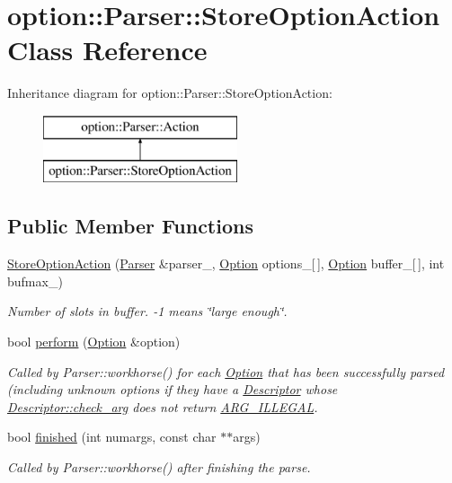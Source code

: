 \hypertarget{classoption_1_1Parser_1_1StoreOptionAction}{}\section{option\+:\+:Parser\+:\+:Store\+Option\+Action Class Reference}
\label{classoption_1_1Parser_1_1StoreOptionAction}
Inheritance diagram for option\+:\+:Parser\+:\+:Store\+Option\+Action\+:\begin{figure}[H]
\begin{center}
\leavevmode
\includegraphics[height=2.000000cm]{classoption_1_1Parser_1_1StoreOptionAction}
\end{center}
\end{figure}
\subsection*{Public Member Functions}
\begin{DoxyCompactItemize}
\item 
\hyperlink{classoption_1_1Parser_1_1StoreOptionAction_aaa638cdd712202e3e10471d4299f7f9d}{Store\+Option\+Action} (\hyperlink{classoption_1_1Parser}{Parser} \&parser\+\_\+, \hyperlink{classoption_1_1Option}{Option} options\+\_\+\mbox{[}$\,$\mbox{]}, \hyperlink{classoption_1_1Option}{Option} buffer\+\_\+\mbox{[}$\,$\mbox{]}, int bufmax\+\_\+)
\begin{DoxyCompactList}\small\item\em Number of slots in {\ttfamily buffer}. {\ttfamily -\/1} means \char`\"{}large enough\char`\"{}. \end{DoxyCompactList}\item 
bool \hyperlink{classoption_1_1Parser_1_1StoreOptionAction_a8931919fba5516377c202920db2b2f84}{perform} (\hyperlink{classoption_1_1Option}{Option} \&option)
\begin{DoxyCompactList}\small\item\em Called by Parser\+::workhorse() for each \hyperlink{classoption_1_1Option}{Option} that has been successfully parsed (including unknown options if they have a \hyperlink{structoption_1_1Descriptor}{Descriptor} whose \hyperlink{structoption_1_1Descriptor_aa5d675dba0214a4abd73007ff163cc67}{Descriptor\+::check\+\_\+arg} does not return \hyperlink{namespaceoption_aee8c76a07877335762631491e7a5a1a9a9528e32563b795bd2930b12d0a5e382d}{A\+R\+G\+\_\+\+I\+L\+L\+E\+G\+AL}. \end{DoxyCompactList}\item 
bool \hyperlink{classoption_1_1Parser_1_1StoreOptionAction_a617f675ef50a72ae36ce91f065bc8441}{finished} (int numargs, const char $\ast$$\ast$args)
\begin{DoxyCompactList}\small\item\em Called by Parser\+::workhorse() after finishing the parse. \end{DoxyCompactList}\end{DoxyCompactItemize}


